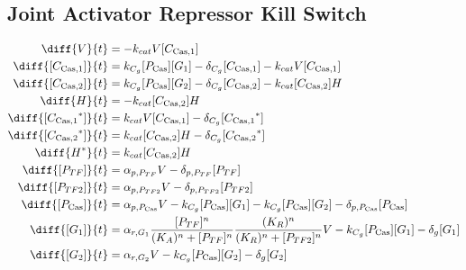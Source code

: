 \subsection{Joint Activator Repressor Kill Switch}
\label{s:Joint_Activator_Repressor_Kill_Switch}

\begin{align}
\diff{\vectorGen{}}{t} & = - \casCutRate{{}}\vectorGen{}\conc{\cplx{\cas}{1}}\\
\diff{\conc{\cplx{\cas}{1}}}{t} & =  \gRnaBind{}\conc{\proSp{\cas{}}}\conc{\gRna{1}} - \casCompDegradeRate{}\conc{\cplx{\cas}{1}} - \casCutRate{{}}\vectorGen{}\conc{\cplx{\cas}{1}}\\
\diff{\conc{\cplx{\cas}{2}}}{t} & =  \gRnaBind{}\conc{\proSp{\cas{}}}\conc{\gRna{2}} - \casCompDegradeRate{}\conc{\cplx{\cas}{2}} - \casCutRate{{}}\conc{\cplx{\cas}{2}}\hostGen{}\\
\diff{\hostGen{}}{t} & = - \casCutRate{{}}\conc{\cplx{\cas}{2}}\hostGen{}\\
\diff{\conc{\bound{\cplx{\cas}{1}}}}{t} & =  \casCutRate{{}}\vectorGen{}\conc{\cplx{\cas}{1}} - \casCompDegradeRate{}\conc{\bound{\cplx{\cas}{1}}}\\
\diff{\conc{\bound{\cplx{\cas}{2}}}}{t} & =  \casCutRate{{}}\conc{\cplx{\cas}{2}}\hostGen{} - \casCompDegradeRate{}\conc{\bound{\cplx{\cas}{2}}}\\
\diff{\edited{\hostGen{}}}{t} & =  \casCutRate{{}}\conc{\cplx{\cas}{2}}\hostGen{}\\
\diff{\conc{\proSp{TF}}}{t} & =  \txtlRate{\proSp{TF}}\vectorGen{} - \proDegradeRate{\proSp{TF}}\conc{\proSp{TF}}\\
\diff{\conc{\proSp{TF2}}}{t} & =  \txtlRate{\proSp{TF2}}\vectorGen{} - \proDegradeRate{\proSp{TF2}}\conc{\proSp{TF2}}\\
\diff{\conc{\proSp{\cas{}}}}{t} & =  \txtlRate{\proSp{\cas{}}}\vectorGen{} - \gRnaBind{}\conc{\proSp{\cas{}}}\conc{\gRna{1}} - \gRnaBind{}\conc{\proSp{\cas{}}}\conc{\gRna{2}} - \proDegradeRate{\proSp{\cas{}}}\conc{\proSp{\cas{}}}\\
\diff{\conc{\gRna{1}}}{t} & =  \txRate{\gRna{1}}\frac{\conc{\proSp{TF}}^n}{(K_A)^n + \conc{\proSp{TF}}^n}\frac{(K_R)^n}{(K_R)^n + \conc{\proSp{TF2}}^n}\vectorGen{} - \gRnaBind{}\conc{\proSp{\cas{}}}\conc{\gRna{1}} - \rnaDegradeRate{}\conc{\gRna{1}}\\
\diff{\conc{\gRna{2}}}{t} & =  \txRate{\gRna{2}}\vectorGen{} - \gRnaBind{}\conc{\proSp{\cas{}}}\conc{\gRna{2}} - \rnaDegradeRate{}\conc{\gRna{2}}
\end{align}

